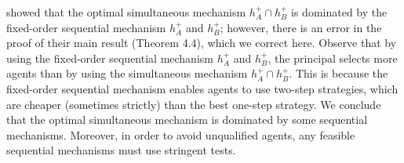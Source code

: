 \citet{zigzag} showed that the optimal simultaneous mechanism  $h_{A}^{+}\cap h_{B}^{+}$ is dominated by the fixed-order sequential mechanism $%
h_{A}^{+}$ and $h_{B}^{+}$; however, there is an error in the proof of their main result (Theorem 4.4), which we correct here. 
Observe that by using the fixed-order sequential mechanism $%
h_{A}^{+}$ and $h_{B}^{+}$, the principal selects more agents than
by using the simultaneous mechanism $h_{A}^{+}\cap h_{B}^{+}$. This is
because the fixed-order sequential mechanism enables agents to use two-step
strategies, which are cheaper (sometimes strictly) than the best one-step
strategy. 
We conclude that the optimal simultaneous mechanism is dominated by some sequential mechanisms. 
Moreover, in order to avoid unqualified agents, any feasible sequential mechanisms must use stringent tests.